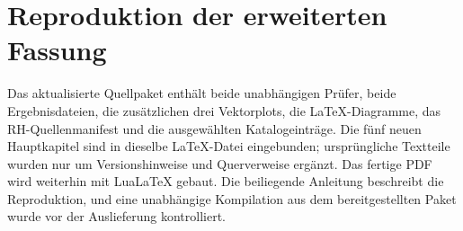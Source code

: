 \section{Reproduktion der erweiterten Fassung}
Das aktualisierte Quellpaket enthält beide unabhängigen Prüfer, beide Ergebnisdateien, die zusätzlichen drei Vektorplots, die LaTeX-Diagramme, das RH-Quellenmanifest und die ausgewählten Katalogeinträge. Die fünf neuen Hauptkapitel sind in dieselbe LaTeX-Datei eingebunden; ursprüngliche Textteile wurden nur um Versionshinweise und Querverweise ergänzt. Das fertige PDF wird weiterhin mit LuaLaTeX gebaut. Die beiliegende Anleitung beschreibt die Reproduktion, und eine unabhängige Kompilation aus dem bereitgestellten Paket wurde vor der Auslieferung kontrolliert.
